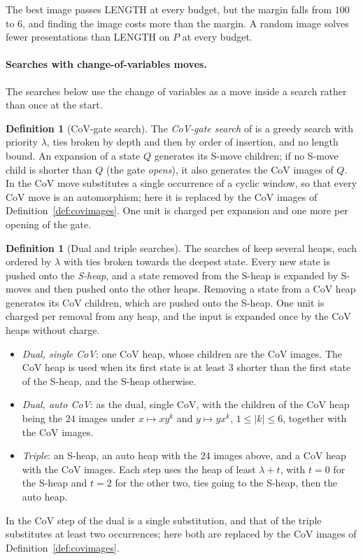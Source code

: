 \documentclass[11pt]{article}
\theoremstyle{definition}
\newtheorem{definition}[theorem]{Definition}
\theoremstyle{remark}
\begin{document}
The best image passes LENGTH at every budget, but the margin falls from $100$ to $6$, and finding the image costs more
than the margin. A random image solves fewer presentations than LENGTH on $P$ at every budget.

\FloatBarrier
\paragraph{Searches with change-of-variables moves.} The searches below use the change of variables as a move inside
a search rather than once at the start.

\begin{definition}[CoV-gate search]\label{def:covgate}
The \emph{CoV-gate search} of \cite{Zan} is a greedy search with priority $\lambda$, ties broken by depth and then by
order of insertion, and no length bound. An expansion of a state $Q$ generates its S-move children; if no S-move
child is shorter than $Q$ (the gate \emph{opens}), it also generates the CoV images of $Q$. In \cite{Zan} the CoV
move substitutes a single occurrence of a cyclic window, so that every CoV move is an automorphism; here it is
replaced by the CoV images of Definition~\ref{def:covimages}. One unit is charged per expansion and one more per
opening of the gate.
\end{definition}

\begin{definition}[Dual and triple searches]\label{def:dualtriple}
The searches of \cite{Ste} keep several heaps, each ordered by $\lambda$ with ties broken towards the deepest state.
Every new state is pushed onto the \emph{S-heap}, and a state removed from the S-heap is expanded by S-moves and then
pushed onto the other heaps. Removing a state from a CoV heap generates its CoV children, which are pushed onto the
S-heap. One unit is charged per removal from any heap, and the input is expanded once by the CoV heaps without charge.
\begin{itemize}
  \item \emph{Dual, single CoV}: one CoV heap, whose children are the CoV images. The CoV heap is used when its first
  state is at least $3$ shorter than the first state of the S-heap, and the S-heap otherwise.
  \item \emph{Dual, auto CoV}: as the dual, single CoV, with the children of the CoV heap being the $24$ images under
  $x\mapsto xy^{k}$ and $y\mapsto yx^{k}$, $1\le|k|\le6$, together with the CoV images.
  \item \emph{Triple}: an S-heap, an auto heap with the $24$ images above, and a CoV heap with the CoV images. Each
  step uses the heap of least $\lambda+t$, with $t=0$ for the S-heap and $t=2$ for the other two, ties going to the
  S-heap, then the auto heap.
\end{itemize}
In \cite{Ste} the CoV step of the dual is a single substitution, and that of the triple substitutes at least two
occurrences; here both are replaced by the CoV images of Definition~\ref{def:covimages}.
\end{definition}
\end{document}
